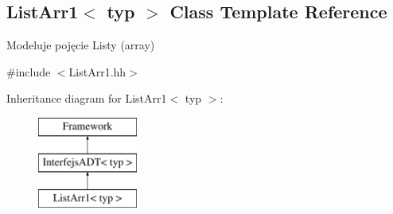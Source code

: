 \hypertarget{class_list_arr1}{\subsection{List\-Arr1$<$ typ $>$ Class Template Reference}
\label{class_list_arr1}
}


Modeluje pojęcie Listy (array)  




{\ttfamily \#include $<$List\-Arr1.\-hh$>$}

Inheritance diagram for List\-Arr1$<$ typ $>$\-:\begin{figure}[H]
\begin{center}
\leavevmode
\includegraphics[height=3.000000cm]{class_list_arr1}
\end{center}
\end{figure}
